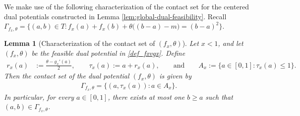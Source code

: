 \documentclass{article}
\newtheorem{lemma}[theorem]{Lemma}
\begin{document}
We make use of the following characterization of the contact set for the centered dual potentials constructed in Lemma \ref{lem:global-dual-feasibility}. Recall \(\Gamma_{f_x,\theta}
    =
    \bigl\{
        (a,b)\in T:
        f_x(a)+f_x(b)
        +\theta\bigl((b-a)-m\bigr)
        =(b-a)^2
    \bigr\} \).

\begin{lemma}[Characterization of the contact set of \((f_x,\theta)\)]
\label{lem:contact-set-characterization}
Let \(x<1\), and let \((f_x,\theta)\) be the feasible dual
potential in \eqref{def_fxvgx}. Define
\begin{align}\label{def_rx_taux_ax}
    r_x(a)
    &:=
    \frac{\theta-g_x'(a)}{2}, \qquad
    \tau_x(a)
    :=
    a+r_x(a),
    \qquad \text{and} \qquad
    A_x:=\{a\in[0,1]:\tau_x(a)\leq1\}.
\end{align}
Then the contact set of the dual potential \((f_x,\theta)\) is given by
\begin{align*}
    \Gamma_{f_x,\theta}
    =
    \bigl\{
        (a,\tau_x(a)):a\in A_x
    \bigr\}.
\end{align*}
In particular, for every \(a\in[0,1]\), there exists at most one
\(b\geq a\) such that \((a,b)\in\Gamma_{f_x,\theta}\).
\end{lemma}
\end{document}
